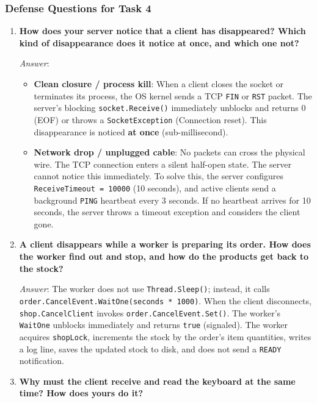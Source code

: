 \documentclass[11pt,a4paper]{article}
\begin{document}
\subsubsection{Defense Questions for Task 4}
\begin{enumerate}[label=\textbf{Q\arabic*.},leftmargin=*]
    \item \textbf{How does your server notice that a client has disappeared? Which kind of disappearance does it notice at once, and which one not?}
    
    \textit{Answer}:
    \begin{itemize}
        \item \textbf{Clean closure / process kill}: When a client closes the socket or terminates its process, the OS kernel sends a TCP \texttt{FIN} or \texttt{RST} packet. The server's blocking \texttt{socket.Receive()} immediately unblocks and returns 0 (EOF) or throws a \texttt{SocketException} (Connection reset). This disappearance is noticed \textbf{at once} (sub-millisecond).
        \item \textbf{Network drop / unplugged cable}: No packets can cross the physical wire. The TCP connection enters a silent half-open state. The server cannot notice this immediately. To solve this, the server configures \texttt{ReceiveTimeout = 10000} (10 seconds), and active clients send a background \texttt{PING} heartbeat every 3 seconds. If no heartbeat arrives for 10 seconds, the server throws a timeout exception and considers the client gone.
    \end{itemize}

    \item \textbf{A client disappears while a worker is preparing its order. How does the worker find out and stop, and how do the products get back to the stock?}
    
    \textit{Answer}: The worker does not use \texttt{Thread.Sleep()}; instead, it calls \texttt{order.CancelEvent.WaitOne(seconds * 1000)}. When the client disconnects, \texttt{shop.CancelClient} invokes \texttt{order.CancelEvent.Set()}. The worker's \texttt{WaitOne} unblocks immediately and returns \texttt{true} (signaled). The worker acquires \texttt{shopLock}, increments the stock by the order's item quantities, writes a log line, saves the updated stock to disk, and does not send a \texttt{READY} notification.

    \item \textbf{Why must the client receive and read the keyboard at the same time? How does yours do it?}
    

\end{enumerate}
\end{document}
